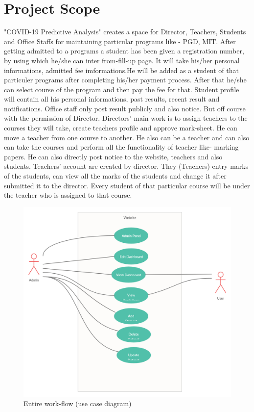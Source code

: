\documentclass{scrreprt}
\begin{document}
\section{Project Scope}
"COVID-19 Predictive Analysis" creates a space for Director, Teachers, Students and Office Staffs for maintaining particular programs like - PGD, MIT. 
\newline
After getting admitted to a programs a student has been given a registration number, by using which he/she can inter from-fill-up page. It will take his/her personal informations, admitted fee imformations.He will be added as a student of that particuler programs after completing his/her payment process. After that he/she can select course of the program and then pay the fee for that. Student profile will contain all his personal informations, past results, recent result and notifications.
\newline
Office staff only post result publicly and also notice. But off course with the permission of Director.  
\newline
Directors' main work is to assign teachers to the courses they will take, create teachers profile and approve mark-sheet. He can move a teacher from one course to another. He also can be a teacher and can also can take the courses and perform all the functionality of teacher like- marking papers. He can also directly post notice to the website, teachers and also students.
\newline
Teachers' account are created by director. They (Teachers) entry marks of the students, can view all the marks of the students and change it after submitted it to the director. Every student of that particular course will be under the teacher who is assigned to that course. 
\newline
\begin{figure}
    \centering
    \includegraphics[width=15cm]{COVID-19 Use Case.png}
    \caption{Entire work-flow (use case diagram)}
    \label{fig:COVID-19 Predictive Analysis}
\end{figure}
\end{document}
